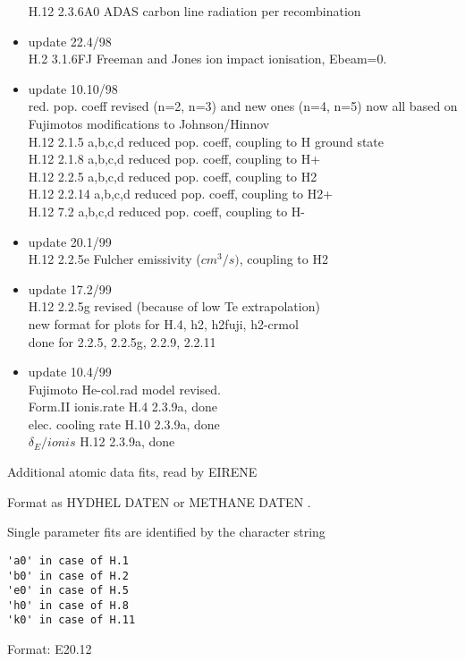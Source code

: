 \begin{itemize}
  H.12 2.3.6A0 ADAS  carbon line radiation per recombination
 \item update   22.4/98 \\
  H.2  3.1.6FJ  Freeman and Jones ion impact ionisation, Ebeam=0.
 \item update   10.10/98 \\
  red. pop. coeff revised (n=2, n=3) and new ones (n=4, n=5)
  now all based on Fujimotos modifications to Johnson/Hinnov\\
  H.12 2.1.5  a,b,c,d  reduced pop. coeff, coupling to H ground state\\
  H.12 2.1.8  a,b,c,d  reduced pop. coeff, coupling to H+\\
  H.12 2.2.5  a,b,c,d  reduced pop. coeff, coupling to H2\\
  H.12 2.2.14 a,b,c,d  reduced pop. coeff, coupling to H2+\\
  H.12 7.2    a,b,c,d  reduced pop. coeff, coupling to H-\\
 \item update   20.1/99 \\
  H.12 2.2.5e Fulcher emissivity ($cm^3/s)$, coupling to H2\\
 \item update   17.2/99 \\
  H.12 2.2.5g revised (because of low Te extrapolation)\\
  new format for plots for H.4,  h2, h2fuji, h2-crmol \\
  done for 2.2.5, 2.2.5g, 2.2.9, 2.2.11
 \item update   10.4/99 \\
  Fujimoto He-col.rad model revised.\\
  Form.II      ionis.rate          H.4  2.3.9a, done \\
               elec. cooling rate  H.10 2.3.9a, done \\
              $\delta_E/ionis$        H.12 2.3.9a, done
\end{itemize}
\newpage
Additional atomic data fits, read by EIRENE

Format as HYDHEL DATEN \cite{kn:Janev}
or METHANE DATEN \cite{kn:Ehrhardt}.
\newpage

Single parameter fits are identified by the character string
\begin{verbatim}
'a0' in case of H.1
'b0' in case of H.2
'e0' in case of H.5
'h0' in case of H.8
'k0' in case of H.11
\end{verbatim}
Format: E20.12

